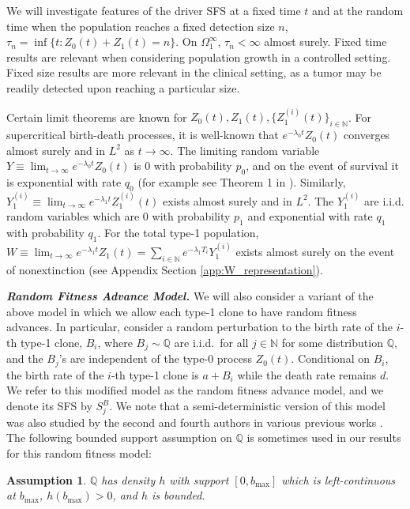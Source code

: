 \documentclass{article}
\numberwithin{equation}{section}
\newtheorem{assumptionstar}{Assumption}
\begin{document}
We will investigate features of the driver SFS at a fixed time $t$ and at the random time when the population reaches a fixed detection size $n$, $\tau_n=\inf \{t:Z_0(t)+Z_1(t)=n\}$. On $\Omega_1^\infty$, $\tau_n < \infty$ almost surely. Fixed time results are relevant when considering population growth in a controlled setting. Fixed size results are more relevant in the clinical setting, as a tumor may be readily detected upon reaching a particular size. 

Certain limit theorems are known for $Z_0(t),Z_1(t),\{Z_1^{(i)}(t)\}_{i\in\mathbb{N}}$. For supercritical birth-death processes, it is well-known that $e^{-\lambda_0 t}Z_0(t)$ converges almost surely and in $L^2$ as $t \to \infty$.
The limiting random variable $Y \equiv \lim_{t \to \infty} e^{-\lambda_0 t}Z_0(t)$ is 0 with probability $p_0$, and on the event of survival it is exponential with rate $q_0$ (for example see Theorem 1 in \cite{durrettbranching2015}). Similarly, $Y_1^{(i)}\equiv\lim_{t\to\infty}e^{-\lambda_1 t}Z_1^{(i)}(t)$ exists almost surely and in $L^2$. The $Y_1^{(i)}$ are i.i.d. random variables which are 0 with probability $p_1$ and exponential with rate $q_1$ with probability $q_1$. For the total type-1 population, $W\equiv\lim_{t\to\infty}e^{-\lambda_1 t}Z_1(t)=\sum_{i\in\mathbb{N}}e^{-\lambda_1 T_i}Y_1^{(i)}$ exists almost surely on the event of nonextinction (see Appendix Section \ref{app:W_representation}). 



{\bf \em Random Fitness Advance Model.}
We will also consider a variant of the above model in which we allow each type-1 clone to have random fitness advances. In particular, consider a random perturbation to the birth rate of the $i$-th type-1 clone, $B_i$, where $B_j\sim \mathbb{Q}$ are i.i.d.~for all $j\in \mathbb{N}$ for some distribution $\mathbb{Q}$, and the $B_j$'s are independent of the type-0 process $Z_0(t)$.  Conditional on $B_i$, the birth rate of the $i$-th type-1 clone is $a+B_i$ while the death rate remains $d$. %
We refer to this modified model as the random fitness advance model, and we denote its SFS by $S_j^B$.
We note that a semi-deterministic version of this model was also studied by the second and fourth authors in various previous works \cite{durrettfoo2010, durrettgenetics2010, foo2014escape}. The following bounded support assumption on $\mathbb{Q}$ is sometimes used in our results for this random fitness model:

\begin{assumptionstar}
    $\mathbb{Q}$ has density $h$ with support $[0,b_{\max}]$ which is left-continuous at $b_{\max}$, $h(b_{\max})>0$, and $h$ is bounded.\label{assumption:random}
\end{assumptionstar}
\end{document}
